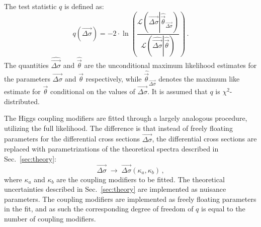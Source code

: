 The test statistic $q$ is defined as:
% 
\begin{equation}
q(\vec{\Delta\sigma}) = -2 \cdot \ln \left(
    \frac{
        \mathcal{L}
            \left(
            \vec{\Delta\sigma} \left| \hat{\vec{\theta}}_{\vec{\Delta\sigma}}
            \right)\right.
        }{
        \mathcal{L}
            \left(
            \hat{\vec{\Delta\sigma}} \left| \hat{\vec{\theta}}
            \right)\right.
        }
\right)
\,.
\label{eq:TestStatisticQ}
\end{equation}
% 
% 
The quantities $\hat{\vec{\Delta\sigma}}$ and $\hat{\vec{\theta}}$ are the unconditional maximum likelihood estimates for the parameters $\vec{\Delta\sigma}$ and $\vec{\theta}$ respectively, while $\hat{\vec{\theta}}_{\vec{\Delta\sigma}}$ denotes the maximum like estimate for $\vec{\theta}$ conditional on the values of $\vec{\Delta\sigma}$.
% 
% 
% 
% 
It is assumed that $q$ is $\chi^2$-distributed.
% 

The Higgs coupling modifiers are fitted through a largely analogous procedure, utilizing the full likelihood.
% 
The difference is that instead of freely floating parameters for the differential cross sections $\vec{\Delta\sigma}$, the differential cross sections are replaced with parametrizations of the theoretical spectra described in Sec.~\ref{sec:theory}:
% 
\begin{equation}
    \vec{\Delta\sigma} \; \to \; \vec{\Delta\sigma}( \kappa_a, \kappa_b )
    \,,
\end{equation}
% 
where $\kappa_a$ and $\kappa_b$ are the coupling modifiers to be fitted.
% 
The theoretical uncertainties described in Sec.~\ref{sec:theory} are implemented as nuisance parameters.
% 
The coupling modifiers are implemented as freely floating parameters in the fit, and as such the corresponding degree of freedom of $q$ is equal to the number of coupling modifiers.





